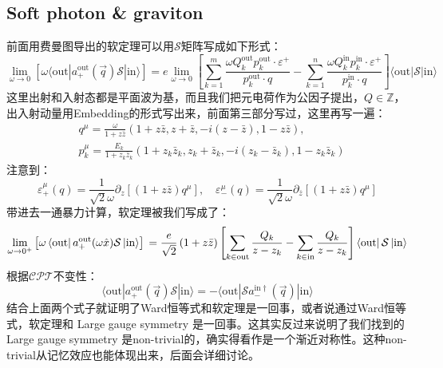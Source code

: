 \subsection{Soft photon \& graviton}
前面用费曼图导出的软定理可以用$\mathcal{S}$矩阵写成如下形式：
\begin{equation}
	\lim\limits_{\omega\to0}\left[\omega\langle\text{out}|a_+^\text{out}(\vec{q})\mathcal{S}|\text{in}\rangle\right]=e\lim\limits_{\omega\to0}\left[\sum\limits_{k=1}^m\frac{\omega Q_k^\text{out}p_k^\text{out}\cdot\varepsilon^+}{p_k^\text{out}\cdot q}-\sum\limits_{k=1}^n\frac{\omega Q_k^\text{in}p_k^\text{in}\cdot\varepsilon^+}{p_k^\text{in}\cdot q}\right]\langle\text{out}|\mathcal{S}|\text{in}\rangle 
\end{equation}
这里出射和入射态都是平面波为基，而且我们把元电荷作为公因子提出，$Q\in\mathbb{Z}$，出入射动量用Embedding的形式写出来，前面第三部分写过，这里再写一遍：
\begin{equation}\label{eq:25.19}
	\begin{aligned}
		&q^{\mu} =\frac\omega{1+z\bar{z}}\left(1+z\bar{z},z+\bar{z},-i(z-\bar{z}),1-z\bar{z}\right),  \\
		&p_{k}^{\mu} =\frac{E_{k}}{1+z_{k}\bar{z}_{k}}\left(1+z_{k}\bar{z}_{k},z_{k}+\bar{z}_{k},-i(z_{k}-\bar{z}_{k}),1-z_{k}\bar{z}_{k}\right) 
	\end{aligned}
\end{equation}
注意到：
\begin{equation}
	\varepsilon_{+}^{\mu}(q)=\frac{1}{\sqrt{2}\omega}\partial_{z}\left[\left(1+z\bar{z}\right)q^{\mu}\right],\quad\varepsilon_{-}^{\mu}(q)=\frac{1}{\sqrt{2}\omega}\partial_{\bar{z}}\left[\left(1+z\bar{z}\right)q^{\mu}\right]
\end{equation}
带进去一通暴力计算，软定理被我们写成了：
\begin{equation}
\lim_{\omega\to0^+}\left[\omega\left\langle\mathrm{out}\right|a_+^\mathrm{out}(\omega\hat{x})\mathcal{S}\left|\mathrm{in}\right\rangle\right]\\=\frac{e}{\sqrt{2}}\left(1+z\bar{z}\right)\left[\sum_{k\in\mathrm{out}}\frac{Q_k}{z-z_k}-\sum_{k\in\mathrm{in}}\frac{Q_k}{z-z_k}\right]\left\langle\mathrm{out}\right|\mathcal{S}\left|\mathrm{in}\right\rangle
\end{equation}
根据${\mathcal{CPT}}$不变性：
\begin{equation}
\langle\text{out}|a_+^\text{out}(\vec{q})\mathcal{S}|\text{in}\rangle=-\langle\mathrm{out}|\mathcal{S}a_{-}^{\mathrm{in}\dagger}(\vec{q})|\mathrm{in}\rangle
\end{equation}
结合上面两个式子就证明了Ward恒等式和软定理是一回事，或者说通过Ward恒等式，软定理和 Large gauge symmetry 是一回事。这其实反过来说明了我们找到的 Large gauge symmetry 是non-trivial的，确实得看作是一个渐近对称性。这种non-trivial从记忆效应也能体现出来，后面会详细讨论。

